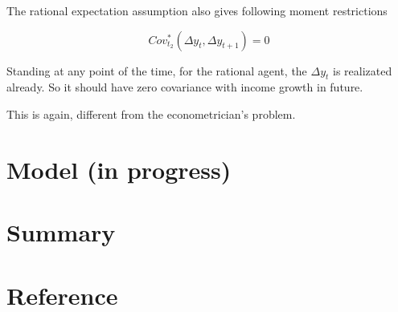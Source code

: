 \documentclass[12pt,notitlepage,onecolumn,aps,pra]{revtex4-1}
\begin{document}
The rational expectation assumption also gives following moment
restrictions

\begin{equation}
Cov^*_{t_2}(\Delta y_t, \Delta y_{t+1}) = 0
\end{equation}

Standing at any point of the time, for the rational agent, the
\(\Delta y_t\) is realizated already. So it should have zero covariance
with income growth in future.

This is again, different from the econometrician's problem.

    \hypertarget{model-in-progress}{%
\section{Model (in progress)}\label{model-in-progress}}

    \hypertarget{summary}{%
\section{Summary}\label{summary}}

    \hypertarget{reference}{%
\section{Reference}\label{reference}}
\end{document}
